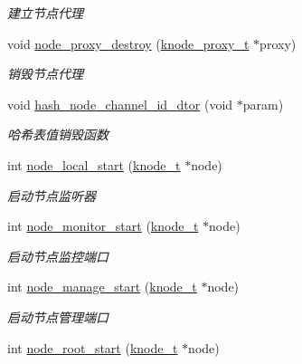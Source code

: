 \begin{DoxyCompactItemize}
\begin{DoxyCompactList}\small\item\em 建立节点代理 \end{DoxyCompactList}\item 
void \hyperlink{a00101_af6bad41d52b417a55c11da5cea7fc3fb_af6bad41d52b417a55c11da5cea7fc3fb}{node\+\_\+proxy\+\_\+destroy} (\hyperlink{a00066_a5025c3e4422f5f55b981aad6e56b6d89_a5025c3e4422f5f55b981aad6e56b6d89}{knode\+\_\+proxy\+\_\+t} $\ast$proxy)
\begin{DoxyCompactList}\small\item\em 销毁节点代理 \end{DoxyCompactList}\item 
void \hyperlink{a00101_a19fc8de5ab5967c2625e61ff869f6547_a19fc8de5ab5967c2625e61ff869f6547}{hash\+\_\+node\+\_\+channel\+\_\+id\+\_\+dtor} (void $\ast$param)
\begin{DoxyCompactList}\small\item\em 哈希表值销毁函数 \end{DoxyCompactList}\item 
int \hyperlink{a00101_aa7e1bfaa23bf8cc7241c034063296cf6_aa7e1bfaa23bf8cc7241c034063296cf6}{node\+\_\+local\+\_\+start} (\hyperlink{a00066_a5e720b27efbc9ad744240f5f4233763a_a5e720b27efbc9ad744240f5f4233763a}{knode\+\_\+t} $\ast$node)
\begin{DoxyCompactList}\small\item\em 启动节点监听器 \end{DoxyCompactList}\item 
int \hyperlink{a00101_a5e5fcccd2fb05ab7a07f8c005099f84d_a5e5fcccd2fb05ab7a07f8c005099f84d}{node\+\_\+monitor\+\_\+start} (\hyperlink{a00066_a5e720b27efbc9ad744240f5f4233763a_a5e720b27efbc9ad744240f5f4233763a}{knode\+\_\+t} $\ast$node)
\begin{DoxyCompactList}\small\item\em 启动节点监控端口 \end{DoxyCompactList}\item 
int \hyperlink{a00101_a2f0598c2b8f04a787f9016afb1247b63_a2f0598c2b8f04a787f9016afb1247b63}{node\+\_\+manage\+\_\+start} (\hyperlink{a00066_a5e720b27efbc9ad744240f5f4233763a_a5e720b27efbc9ad744240f5f4233763a}{knode\+\_\+t} $\ast$node)
\begin{DoxyCompactList}\small\item\em 启动节点管理端口 \end{DoxyCompactList}\item 
int \hyperlink{a00101_a8fe081822efe2065d27b69ab0c2f1386_a8fe081822efe2065d27b69ab0c2f1386}{node\+\_\+root\+\_\+start} (\hyperlink{a00066_a5e720b27efbc9ad744240f5f4233763a_a5e720b27efbc9ad744240f5f4233763a}{knode\+\_\+t} $\ast$node)

\end{DoxyCompactItemize}
